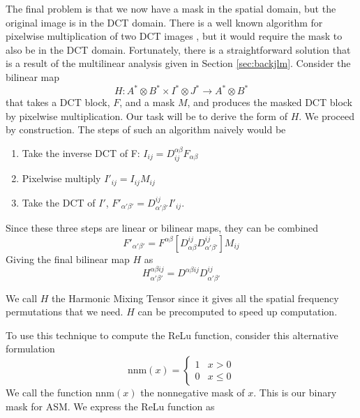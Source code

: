 \documentclass[10pt,twocolumn,letterpaper]{article}
\begin{document}
The final problem is that we now have a mask in the spatial domain, but the original image is in the DCT domain. There is a well known algorithm for pixelwise multiplication of two DCT images \cite{smith1993algorithms}, but it would require the mask to also be in the DCT domain. Fortunately, there is a straightforward solution that is a result of the multilinear analysis given in Section \ref{sec:backjlm}. Consider the bilinear map 
\begin{equation}
H: A^* \otimes B^* \times I^* \otimes J^* \rightarrow A^* \otimes B^*
\end{equation}
that takes a DCT block, $F$, and a mask $M$, and produces the masked DCT block by pixelwise multiplication. Our task will be to derive the form of $H$. We proceed by construction. The steps of such an algorithm naively would be 
\begin{enumerate}
    \item Take the inverse DCT of F: $I_{ij} = D^{\alpha\beta}_{ij}F_{\alpha\beta}$
    \item Pixelwise multiply $I'_{ij} = I_{ij}M_{ij}$
    \item Take the DCT of $I'$, $F'_{\alpha'\beta'} = D^{ij}_{\alpha'\beta'}I'_{ij}$.
\end{enumerate}
Since these three steps are linear or bilinear maps, they can be combined 
\begin{equation}
F'_{\alpha'\beta'} = F^{\alpha\beta}[D^{ij}_{\alpha\beta}D^{ij}_{\alpha'\beta'}]M_{ij}
\end{equation}
Giving the final bilinear map $H$ as 
\begin{equation}
H^{\alpha\beta ij}_{\alpha'\beta'} = D^{\alpha\beta ij}D^{ij}_{\alpha'\beta'}
\end{equation}

We call $H$ the Harmonic Mixing Tensor since it gives all the spatial frequency permutations that we need. $H$ can be precomputed to speed up computation.

To use this technique to compute the ReLu function, consider this alternative formulation
\newcommand{\nnm}{\mathrm{nnm}}\begin{equation}
    \nnm(x) = \begin{cases}
    1 & x > 0 \\
    0 & x \leq 0
    \end{cases}
\end{equation}
We call the function $\nnm(x)$ the nonnegative mask of $x$. This is our binary mask for ASM. We express the ReLu function as 
\end{document}
